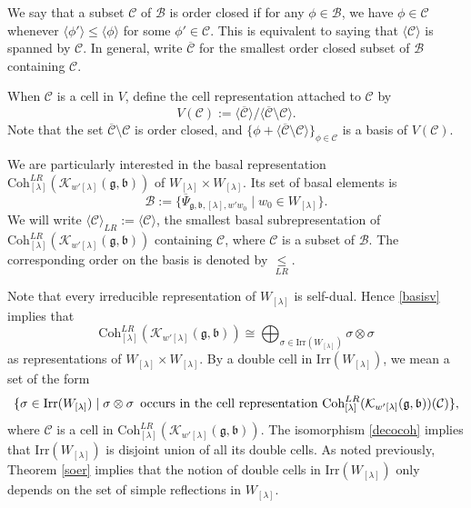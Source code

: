 \documentclass[12pt,a4paper]{amsart}
\newcommand{\CB}{{\mathcal {B}}}
\newcommand{\CC}{{\mathcal {C}}}
\newcommand{\CK}{{\mathcal {K}}}
\newcommand{\g}{\mathfrak g}
\renewcommand{\b}{\mathfrak b}
\newcommand{\la}{\langle}
\newcommand{\ra}{\rangle}
\numberwithin{equation}{section}
\newtheorem{lem}[thm]{Lemma}
\theoremstyle{remark}
\def\Irr{\mathrm{Irr}}
\def\Coh{\mathrm{Coh}}
\def\leqLR{\mathrel{\mathop{\leq}\limits_{\scriptscriptstyle LR}}}
\newcommand{\Lam}{{[\lambda]}}
\begin{document}
We say that a subset $\CC$ of $\CB$ is order closed if for any $\phi\in \CB$, we have $\phi\in \CC$ whenever $\la \phi'\ra\leq \la \phi\ra $ for some $\phi'\in \CC$.
This is equivalent to saying that $\la \CC\ra$ is spanned by $\CC$. In general, write $\overline \CC$ for the smallest order closed subset of $\CB$ containing $\CC$.

When $\CC$ is a cell in $V$, define the cell representation attached to $\CC$ by
\[
  V(\CC):=\la \overline \CC \ra/ \la \overline \CC\setminus \CC\ra.
\]
Note that the set $ \overline \CC\setminus \CC$ is order closed, and $\{\phi+ \la \overline \CC\setminus \CC\ra\}_{ \phi\in \CC}$ is a basis of $V(\CC)$.




We are particularly interested in the basal representation $\Coh^{LR}_{\Lam}( \CK_{ w'\Lam}(\g,\b))$ of $W_\Lam\times W_\Lam$. Its set of basal elements is
\[
  \CB:= \{ \overline \Psi_{\g,\b, \Lam, w'w_0}\mid w_0\in W_\Lam\}.
\]
We will write $ \la \CC\ra_{LR}:=\la \CC \ra $, the smallest basal
subrepresentation of $\Coh^{LR}_{\Lam}( \CK_{ w'\Lam}(\g,\b))$ containing $\CC$,
where $\CC$ is a subset of $\CB$.
The corresponding order on the basis is denoted by $\leqLR$.


Note that every irreducible representation of $W_\Lam$ is self-dual. Hence \eqref{basisv} implies that
\begin{equation}\label{decocoh}
  \Coh^{LR}_{\Lam}( \CK_{w'\Lam}(\g,\b))\cong \bigoplus_{\sigma\in \Irr(W_\Lam)} \sigma\otimes \sigma
\end{equation}
as representations of $W_\Lam\times W_\Lam$. By a double cell in  $\Irr(W_\Lam)$, we mean a set of the form
\[
  \{\sigma\in \Irr(W_\Lam)\mid \sigma\otimes \sigma\,  \textrm{ occurs in the cell representation $ \Coh^{LR}_{\Lam}( \CK_{w'\Lam}(\g,\b))(\mathcal C)$}\},
\]
where $\CC$ is a cell in $ \Coh^{LR}_{\Lam}( \CK_{w'\Lam}(\g,\b))$.
The isomorphism \eqref{decocoh} implies that $\Irr(W_\Lam)$ is disjoint union of all
its double cells.
As noted previously, Theorem \ref{soer} implies that the
notion of double cells in $\Irr(W_\Lam)$ only depends on the set of simple
reflections in $W_\Lam$.
\end{document}
